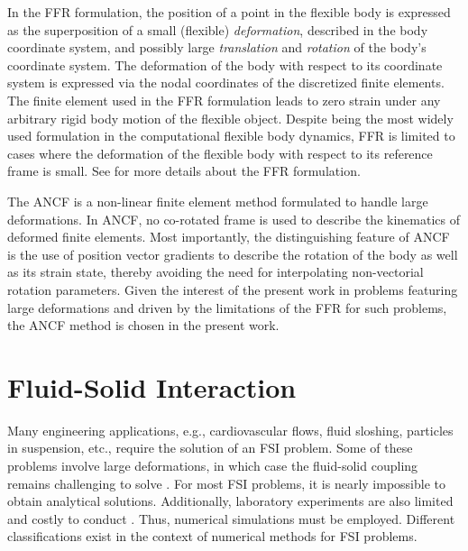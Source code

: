 In the FFR formulation, the position of a point in the flexible body is expressed as the superposition of a small (flexible) \textit{deformation}, described in the body coordinate system, and possibly large \textit{translation} and \textit{rotation} of the body's coordinate system. The deformation of the body with respect to its coordinate system is expressed via the nodal coordinates of the discretized finite elements. The finite element used in the FFR formulation leads to zero strain under any arbitrary rigid body motion of the flexible object. Despite being the most widely used formulation in the computational flexible body dynamics, FFR is limited to cases where the deformation of the flexible body with respect to its reference frame is small. See \cite{Shabana1997,TR-2016-05-Recuero} for more details about the FFR formulation.  

The ANCF is a non-linear finite element method formulated to handle large deformations. In ANCF, no co-rotated frame is used to describe the kinematics of deformed finite elements. Most importantly, the distinguishing feature of ANCF is the use of position vector gradients to describe the rotation of the body as well as its strain state, thereby avoiding the need for interpolating non-vectorial rotation parameters. Given the interest of the present work in problems featuring large deformations and driven by the limitations of the FFR for such problems, the ANCF method is chosen in the present work. 


\section{Fluid-Solid Interaction}\label{sec:FSI_intro}
Many engineering applications, e.g., cardiovascular flows, fluid sloshing, particles in suspension, etc., require the solution of an FSI problem. Some of these problems involve large deformations, in which case the fluid-solid coupling remains challenging to solve \cite{ryzhakov2010}. For most FSI problems, it is nearly impossible to obtain analytical solutions. Additionally, laboratory experiments are also limited and costly to conduct \cite{hou2012}. Thus, numerical simulations must be employed. Different classifications exist in the context of numerical methods for FSI problems.

